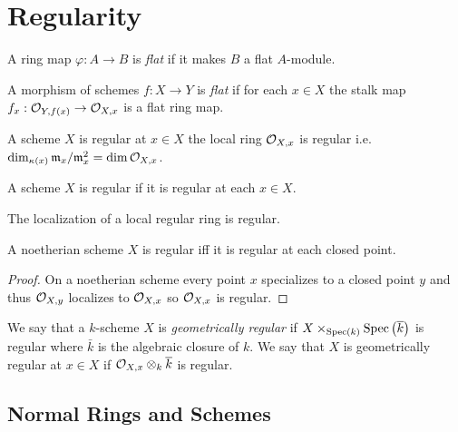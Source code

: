 \documentclass[12pt]{article}
\begin{document}
\section{Regularity}

\begin{definition}
A ring map $\varphi : A \to B$ is \textit{flat} if it makes $B$ a flat $A$-module.
\end{definition}

\begin{definition}
A morphism of schemes $f : X \to Y$ is \textit{flat} if for each $x \in X$ the stalk map $f_x : \mathcal{O}_{Y, f(x)} \to \mathcal{O}_{X, x}$ is a flat ring map.
\end{definition}

\begin{definition}
A scheme $X$ is regular at $x \in X$ the local ring $\mathcal{O}_{X, x}$ is regular i.e. $\dim_{\kappa(x)} \mathfrak{m}_x / \mathfrak{m}_x^2 = \dim{\mathcal{O}_{X, x}}$. 
\end{definition}

\begin{definition}
A scheme $X$ is regular if it is regular at each $x \in X$.
\end{definition}

\begin{lemma}
The localization of a local regular ring is regular.
\end{lemma}

\begin{corollary}
A noetherian scheme $X$ is regular iff it is regular at each closed point.
\end{corollary}

\begin{proof}
On a noetherian scheme every point $x$ specializes to a closed point $y$ and thus $\mathcal{O}_{X, y}$ localizes to $\mathcal{O}_{X, x}$ so $\mathcal{O}_{X, x}$ is regular.
\end{proof}

\begin{definition}
We say that a $k$-scheme $X$ is \textit{geometrically regular} if $X \times_{\mathrm{Spec}\left( k \right)} \mathrm{Spec}\left( \overline{k} \right)$ is regular where $\bar{k}$ is the algebraic closure of $k$. We say that $X$ is geometrically regular at $x \in X$ if $\mathcal{O}_{X, x} \otimes_k \overline{k}$ is regular.
\end{definition}

\subsection{Normal Rings and Schemes}
\end{document}
